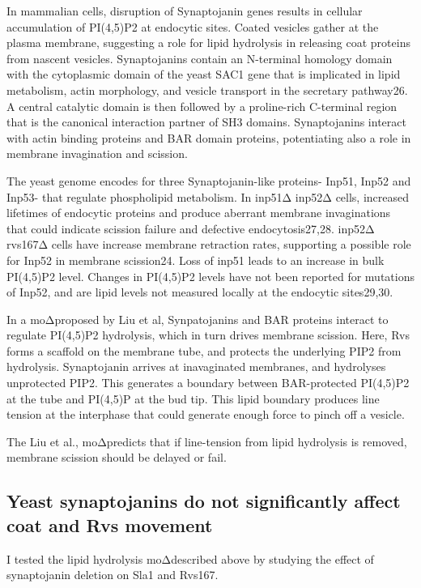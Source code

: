 In mammalian cells, disruption of Synaptojanin genes results in cellular accumulation of PI(4,5)P2 at endocytic sites. Coated vesicles gather at the plasma membrane, suggesting a role for lipid hydrolysis in releasing coat proteins from nascent vesicles. Synaptojanins contain an N-terminal homology domain with the cytoplasmic domain of the yeast SAC1 gene that is implicated in lipid metabolism, actin morphology, and vesicle transport in the secretary pathway26. A central catalytic domain is then followed by a proline-rich C-terminal region that is the canonical interaction partner of SH3 domains. Synaptojanins interact with actin binding proteins and BAR domain proteins, potentiating also a role in membrane invagination and scission. 

The yeast genome encodes for three Synaptojanin-like proteins- Inp51, Inp52 and Inp53- that regulate phospholipid metabolism. In inp51Δ inp52Δ cells, increased lifetimes of endocytic proteins and produce aberrant membrane invaginations that could indicate scission failure and defective endocytosis27,28. inp52Δ rvs167Δ cells have increase membrane retraction rates, supporting a possible role for Inp52 in membrane scission24. Loss of inp51 leads to an increase in bulk PI(4,5)P2 level. Changes in PI(4,5)P2 levels have not been reported for mutations of Inp52, and are lipid levels not measured locally at the endocytic sites29,30.

In a moΔproposed by Liu et al, Synpatojanins and BAR proteins interact to regulate PI(4,5)P2 hydrolysis, which in turn drives membrane scission. Here, Rvs forms a scaffold on the membrane tube, and protects the underlying PIP2 from hydrolysis. Synaptojanin arrives at inavaginated membranes, and hydrolyses unprotected PIP2. This generates a boundary between BAR-protected PI(4,5)P2 at the tube and PI(4,5)P at the bud tip. This lipid boundary produces line tension at the interphase that could generate enough force to pinch off a vesicle. 

The Liu et al., moΔpredicts that if line-tension from lipid hydrolysis is removed, membrane scission should be delayed or fail.


	\subsection{Yeast synaptojanins do not significantly affect coat and Rvs movement } 

	
	
I tested the lipid hydrolysis moΔdescribed above by studying the effect of synaptojanin deletion on Sla1 and Rvs167. 

